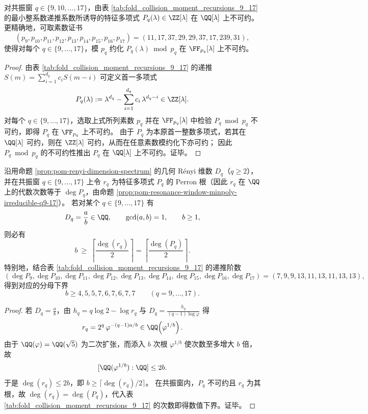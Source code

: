\begin{proposition}[共振窗 \texorpdfstring{$q=9,\dots,17$}{q=9..17} 的不可约性与模素数证书]\label{prop:pom-resonance-window-minpoly-irreducible-q9-17}
对共振窗 \(q\in\{9,10,\dots,17\}\)，由表 \ref{tab:fold_collision_moment_recursions_9_17} 的最小整系数递推系数所诱导的特征多项式 \(P_q(\lambda)\in\ZZ[\lambda]\) 在 \(\QQ[\lambda]\) 上不可约。
更精确地，可取素数证书
\[
(p_9,p_{10},p_{11},p_{12},p_{13},p_{14},p_{15},p_{16},p_{17})
=(11,17,37,29,29,37,17,239,31),
\]
使得对每个 \(q\in\{9,\dots,17\}\)，模 \(p_q\) 约化 \(P_q(\lambda)\bmod p_q\) 在 \(\FF_{p_q}[\lambda]\) 上不可约。
\end{proposition}
\begin{proof}
由表 \ref{tab:fold_collision_moment_recursions_9_17} 的递推
\(
S(m)=\sum_{i=1}^{d_q}c_i S(m-i)
\)
可定义首一多项式
\[
P_q(\lambda):=\lambda^{d_q}-\sum_{i=1}^{d_q}c_i\,\lambda^{d_q-i}\in\ZZ[\lambda].
\]
对每个 \(q\in\{9,\dots,17\}\)，选取上式所列素数 \(p_q\) 并在 \(\FF_{p_q}[\lambda]\) 中检验 \(P_q\bmod p_q\) 不可约，即得 \(P_q\) 在 \(\FF_{p_q}\) 上不可约。
由于 \(P_q\) 为本原首一整数多项式，若其在 \(\QQ[\lambda]\) 可约，则在 \(\ZZ[\lambda]\) 可约，从而在任意素数模约化下亦可约；
因此 \(P_q\bmod p_q\) 的不可约性推出 \(P_q\) 在 \(\QQ[\lambda]\) 上不可约。证毕。
\end{proof}

\begin{corollary}\label{cor:pom-renyi-dimension-rational-denominator-degree-lb-q9-17}
沿用命题 \ref{prop:pom-renyi-dimension-spectrum} 的几何 Rényi 维数 \(D_q\)（\(q\ge 2\)），并在共振窗 \(q\in\{9,\dots,17\}\) 上令 \(r_q\) 为特征多项式 \(P_q\) 的 Perron 根（因此 \(r_q\) 在 \(\QQ\) 上的代数次数等于 \(\deg P_q\)，由命题 \ref{prop:pom-resonance-window-minpoly-irreducible-q9-17}）。
若对某个 \(q\in\{9,\dots,17\}\) 有
\[
D_q=\frac{a}{b}\in\QQ,\qquad \gcd(a,b)=1,\qquad b\ge 1,
\]
则必有
\[
b\ \ge\ \left\lceil\frac{\deg(r_q)}{2}\right\rceil
=
\left\lceil\frac{\deg(P_q)}{2}\right\rceil.
\]
特别地，结合表 \ref{tab:fold_collision_moment_recursions_9_17} 的递推阶数
\[
(\deg P_9,\deg P_{10},\deg P_{11},\deg P_{12},\deg P_{13},\deg P_{14},\deg P_{15},\deg P_{16},\deg P_{17})
=(7,9,9,13,11,13,11,13,13),
\]
得到对应的分母下界
\[
b\ge 4,5,5,7,6,7,6,7,7
\qquad
(q=9,\dots,17).
\]
\end{corollary}
\begin{proof}
若 \(D_q=\frac{a}{b}\)，由 \(h_q=q\log 2-\log r_q\) 与 \(D_q=\frac{h_q}{(q-1)\log\varphi}\) 得
\[
r_q
=2^q\,\varphi^{-(q-1)a/b}
\in \QQ\!\left(\varphi^{1/b}\right).
\]
由于 \(\QQ(\varphi)=\QQ(\sqrt5)\) 为二次扩张，而添入 \(b\) 次根 \(\varphi^{1/b}\) 使次数至多增大 \(b\) 倍，故
\[
[\QQ(\varphi^{1/b}):\QQ]\le 2b.
\]
于是 \(\deg(r_q)\le 2b\)，即 \(b\ge \lceil\deg(r_q)/2\rceil\)。
在共振窗内，\(P_q\) 不可约且 \(r_q\) 为其根，故 \(\deg(r_q)=\deg(P_q)\)，代入表 \ref{tab:fold_collision_moment_recursions_9_17} 的次数即得数值下界。证毕。
\end{proof}

